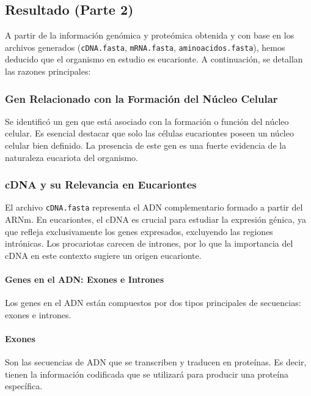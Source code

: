 \subsection*{Resultado (Parte 2)}

A partir de la información genómica y proteómica obtenida y con base en los archivos generados (\texttt{cDNA.fasta}, \texttt{mRNA.fasta}, \texttt{aminoacidos.fasta}), hemos deducido que el organismo en estudio es eucarionte. A continuación, se detallan las razones principales:

\subsubsection*{Gen Relacionado con la Formación del Núcleo Celular}

Se identificó un gen que está asociado con la formación o función del núcleo celular. Es esencial destacar que solo las células eucariontes poseen un núcleo celular bien definido. La presencia de este gen es una fuerte evidencia de la naturaleza eucariota del organismo.

\subsubsection*{cDNA y su Relevancia en Eucariontes}

El archivo \texttt{cDNA.fasta} representa el ADN complementario formado a partir del ARNm. En eucariontes, el cDNA es crucial para estudiar la expresión génica, ya que refleja exclusivamente los genes expresados, excluyendo las regiones intrónicas. Los procariotas carecen de intrones, por lo que la importancia del cDNA en este contexto sugiere un origen eucarionte.

\paragraph{Genes en el ADN: Exones e Intrones}

Los genes en el ADN están compuestos por dos tipos principales de secuencias: exones e intrones.

\paragraph{Exones}

Son las secuencias de ADN que se transcriben y traducen en proteínas. Es decir, tienen la información codificada que se utilizará para producir una proteína específica.

